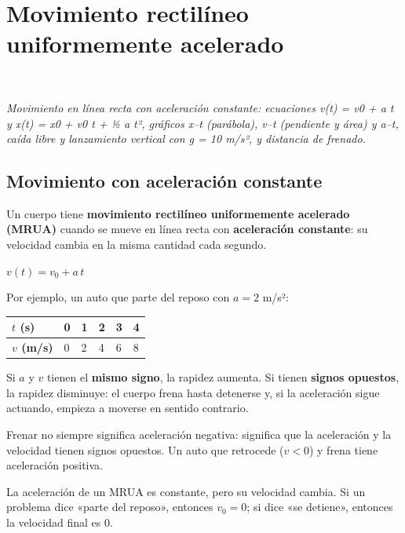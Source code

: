 \section[Movimiento rectilíneo uniformemente acelerado]{Movimiento rectilíneo uniformemente acelerado}
\modcomun\ \ {\color{gris}\itshape Movimiento en línea recta con aceleración constante: ecuaciones v(t) = v0 + a t y x(t) = x0 + v0 t + ½ a t², gráficos x--t (parábola), v--t (pendiente y área) y a--t, caída libre y lanzamiento vertical con g = 10 m/s², y distancia de frenado.\par}
\subsection{Movimiento con aceleración constante}
Un cuerpo tiene \textbf{movimiento rectilíneo uniformemente acelerado (MRUA)} cuando se mueve en línea recta con \textbf{aceleración constante}: su velocidad cambia en la misma cantidad cada segundo.

 
\begin{center}
$v(t) = v_0 + a\,t$
\end{center}
 

Por ejemplo, un auto que parte del reposo con $a = 2$ m/s²:

 
\begin{center}\small
\begin{tabular}{@{}llllll@{}}
\toprule
\textbf{$t$ (s)} & \textbf{0} & \textbf{1} & \textbf{2} & \textbf{3} & \textbf{4} \\
\midrule
\textbf{$v$ (m/s)} & 0 & 2 & 4 & 6 & 8 \\
\bottomrule
\end{tabular}
\end{center}
 

Si $a$ y $v$ tienen el \textbf{mismo signo}, la rapidez aumenta. Si tienen \textbf{signos opuestos}, la rapidez disminuye: el cuerpo frena hasta detenerse y, si la aceleración sigue actuando, empieza a moverse en sentido contrario.

  
\begin{clave}[{Recuerda}] Frenar no siempre significa aceleración negativa: significa que la aceleración y la velocidad tienen signos opuestos. Un auto que retrocede ($v < 0$) y frena tiene aceleración positiva.\end{clave}
 
\begin{clave}[{Recuerda}] La aceleración de un MRUA es constante, pero su velocidad cambia. Si un problema dice «parte del reposo», entonces $v_0 = 0$; si dice «se detiene», entonces la velocidad final es 0.\end{clave}

